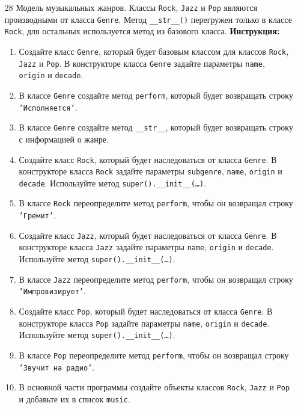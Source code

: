 \begin{enumerate}
\begin{enumerate}
\end{enumerate}
\item[28]
Модель музыкальных жанров. Классы \texttt{Rock}, \texttt{Jazz} и \texttt{Pop} являются производными от класса \texttt{Genre}. Метод \texttt{\_\_str\_\_()} перегружен только в классе \texttt{Rock}, для остальных используется метод из базового класса.
\textbf{Инструкция:}
\begin{enumerate}
    \item Создайте класс \texttt{Genre}, который будет базовым классом для классов \texttt{Rock}, \texttt{Jazz} и \texttt{Pop}. В конструкторе класса \texttt{Genre} задайте параметры \texttt{name}, \texttt{origin} и \texttt{decade}.
    \item В классе \texttt{Genre} создайте метод \texttt{perform}, который будет возвращать строку \texttt{'Исполняется'}.
    \item В классе \texttt{Genre} создайте метод \texttt{\_\_str\_\_}, который будет возвращать строку с информацией о жанре.
    \item Создайте класс \texttt{Rock}, который будет наследоваться от класса \texttt{Genre}. В конструкторе класса \texttt{Rock} задайте параметры \texttt{subgenre}, \texttt{name}, \texttt{origin} и \texttt{decade}. Используйте метод \texttt{super().\_\_init\_\_(\ldots)}.
    \item В классе \texttt{Rock} переопределите метод \texttt{perform}, чтобы он возвращал строку \texttt{'Гремит'}.
    \item Создайте класс \texttt{Jazz}, который будет наследоваться от класса \texttt{Genre}. В конструкторе класса \texttt{Jazz} задайте параметры \texttt{name}, \texttt{origin} и \texttt{decade}. Используйте метод \texttt{super().\_\_init\_\_(\ldots)}.
    \item В классе \texttt{Jazz} переопределите метод \texttt{perform}, чтобы он возвращал строку \texttt{'Импровизирует'}.
    \item Создайте класс \texttt{Pop}, который будет наследоваться от класса \texttt{Genre}. В конструкторе класса \texttt{Pop} задайте параметры \texttt{name}, \texttt{origin} и \texttt{decade}. Используйте метод \texttt{super().\_\_init\_\_(\ldots)}.
    \item В классе \texttt{Pop} переопределите метод \texttt{perform}, чтобы он возвращал строку \texttt{'Звучит на радио'}.
    \item В основной части программы создайте объекты классов \texttt{Rock}, \texttt{Jazz} и \texttt{Pop} и добавьте их в список \texttt{music}.

\end{enumerate}
\end{enumerate}
